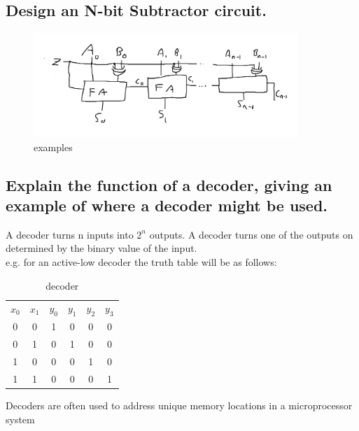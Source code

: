 \documentclass{article}
\begin{document}
\subsection{Design an N-bit Subtractor circuit.}
\begin{figure}[h]
    \centering
    \includegraphics[width=100mm]{digitalLogic5.PNG}
    \caption{examples}
    \label{fig:my_label}
\end{figure}

\subsection{Explain the function of a decoder, giving an example of where a decoder might be used.}
A decoder turns n inputs into $2^n$ outputs. A decoder turns one of the outputs on determined by the binary value of the input.\\
e.g. for an active-low decoder the truth table will be as follows:\\
\begin{table}[h]
    \centering
    \begin{tabular}{|c c|c c c c|}
        $x_0$ & $x_1$ & $y_0$ & $y_1$ & $y_2$ & $y_3$ \\
        0 & 0 & 1 & 0 & 0 & 0\\
        0 & 1 & 0 & 1 & 0 & 0\\
        1 & 0 & 0 & 0 & 1 & 0\\
        1 & 1 & 0 & 0 & 0 & 1
    \end{tabular}
    \caption{decoder}
    \label{tab:my_label}
\end{table}

Decoders are often used to address unique memory locations in a microprocessor system
\newpage
\end{document}
